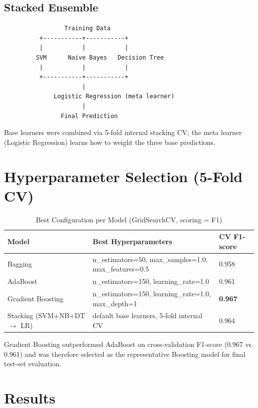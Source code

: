 \documentclass[11pt,a4paper]{article}
\begin{document}
\subsection{Stacked Ensemble}
\begin{verbatim}
                 Training Data
          +-----------+-----------+
          |           |           |
         SVM      Naive Bayes   Decision Tree
          |           |           |
          +-----------+-----------+
                      |
              Logistic Regression (meta learner)
                      |
                Final Prediction
\end{verbatim}
Base learners were combined via 5-fold internal stacking CV; the meta learner (Logistic Regression)
learns how to weight the three base predictions.

\section{Hyperparameter Selection (5-Fold CV)}

\begin{table}[H]
\centering
\caption{Best Configuration per Model (GridSearchCV, scoring = F1)}
\begin{tabular}{lll}
\toprule
Model & Best Hyperparameters & CV F1-score \\
\midrule
Bagging & n\_estimators=50, max\_samples=1.0, max\_features=0.5 & 0.958 \\
AdaBoost & n\_estimators=150, learning\_rate=1.0 & 0.961 \\
Gradient Boosting & n\_estimators=150, learning\_rate=1.0, max\_depth=1 & \textbf{0.967} \\
Stacking (SVM+NB+DT $\to$ LR) & default base learners, 5-fold internal CV & 0.964 \\
\bottomrule
\end{tabular}
\end{table}

Gradient Boosting outperformed AdaBoost on cross-validation F1-score (0.967 vs. 0.961) and was
therefore selected as the representative Boosting model for final test-set evaluation.

\section{Results}
\end{document}
